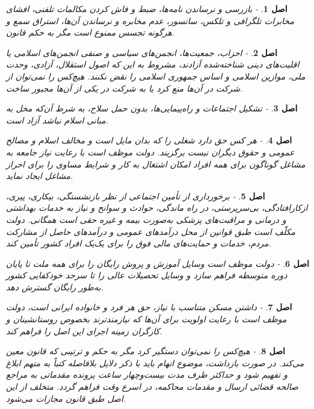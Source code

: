 \documentclass[12pt]{article}
\newtheorem{asl}{اصل}
\begin{document}
\begin{asl}- 
بازرسی و نرساندن نامه‌ها، ضبط و فاش کردن مکالمات تلفنی‌، افشای مخابرات تلگرافی و تلکس‌، سانسور، عدم مخابره و نرساندن آن‌ها، استراق سمع و هرگونه تجسس ممنوع است مگر به حکم قانون‌.
\end{asl}

\begin{asl}- 
احزاب‌، جمعیت‌ها، انجمن‌های سیاسی و صنفی انجمن‌های اسلامی یا اقلیت‌های دینی شناخته‌شده آزادند، مشروط به این که اصول استقلال‌، آزادی‌، وحدت ملی‌، موازین اسلامی و اساس جمهوری اسلامی را نقض نکنند. هیچ‌کس را نمی‌توان از شرکت در آن‌ها منع کرد یا به شرکت در یکی از آن‌ها مجبور ساخت‌.
\end{asl}

\begin{asl}- 
تشکیل اجتماعات و راه‌پیمایی‌ها، بدون حمل سلاح، به شرط آن‌که مخل به مبانی اسلام نباشد آزاد است‌.
\end{asl}

\begin{asl}- 
هر کس حق دارد شغلی را که بدان مایل است و مخالف اسلام و مصالح عمومی و حقوق دیگران نیست برگزیند.
دولت موظف است با رعایت نیاز جامعه به مشاغل گوناگون برای همه افراد امکان اشتغال به کار و شرایط مساوی را برای احراز مشاغل ایجاد نماید.
\end{asl}

\begin{asl}- 
برخورداری از تأمین اجتماعی از نظر بازنشستگی‌، بیکاری‌، پیری‌، ازکارافتادگی، بی‌سرپرستی‌، در راه ماندگی، حوادث و سوانح و نیاز به خدمات بهداشتی و درمانی و مراقبت‌های پزشکی به‌صورت بیمه و غیره حقی است همگانی‌.
دولت مکلّف است طبق قوانین از محل درآمدهای عمومی و درآمدهای حاصل از مشارکت مردم‌، خدمات و حمایت‌های مالی فوق را برای یک‌یک افراد کشور تأمین کند.
\end{asl}

\begin{asl}- 
دولت موظف است وسایل آموزش و پروش رایگان را برای همه ملت تا پایان دوره متوسطه فراهم سازد و وسایل تحصیلات عالی را تا سرحد خودکفایی کشور به‌طور رایگان گسترش دهد.
\end{asl}

\begin{asl}- 
داشتن مسکن متناسب با نیاز، حق هر فرد و خانواده ایرانی است‌، دولت موظف است با رعایت اولویت برای آن‌ها که نیازمندترند بخصوص روستانشینان و کارگران زمینه اجرای این اصل را فراهم کند.
\end{asl}

\begin{asl}- 
هیچ‌کس را نمی‌توان دستگیر کرد مگر به حکم و ترتیبی که قانون معین می‌کند. در صورت بازداشت‌، موضوع اتهام باید با ذکر دلایل بلافاصله کتباً به متهم ابلاغ و تفهیم شود و حداکثر ظرف مدت بیست‌وچهار ساعت پرونده مقدماتی به مراجع صالحه قضائی ارسال و مقدمات محاکمه‌، در اسرع وقت فراهم گردد. متخلف از این اصل طبق قانون مجازات می‌شود.
\end{asl}
\end{document}
